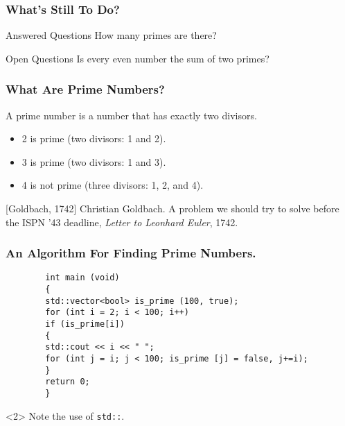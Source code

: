 \documentclass{beamer}
\begin{document}
\begin{frame}
    \frametitle{What’s Still To Do?}
    \begin{block}{Answered Questions}
    How many primes are there?
    \end{block}
    \begin{block}{Open Questions}
    Is every even number the sum of two primes?
    \end{block}
\end{frame}

\begin{frame}[t]
    \frametitle{What Are Prime Numbers?}
    \begin{definition}
    A \alert{prime number} is a number that has exactly two divisors.
    \end{definition}
    \begin{example}
    \begin{itemize}
    \item 2 is prime (two divisors: 1 and 2).
    \item 3 is prime (two divisors: 1 and 3).
    \item 4 is not prime (\alert{three} divisors: 1, 2, and 4).
    \end{itemize}
    \end{example}
\end{frame}

\begin{thebibliography}{10}
    [Goldbach, 1742]
    Christian Goldbach.
    \newblock A problem we should try to solve before the ISPN ’43 deadline,
    \newblock \emph{Letter to Leonhard Euler}, 1742.
\end{thebibliography}

    \begin{frame}[fragile]
        \frametitle{An Algorithm For Finding Prime Numbers.}
        \begin{verbatim}
        int main (void)
        {
        std::vector<bool> is_prime (100, true);
        for (int i = 2; i < 100; i++)
        if (is_prime[i])
        {
        std::cout << i << " ";
        for (int j = i; j < 100; is_prime [j] = false, j+=i);
        }
        return 0;
        }
        \end{verbatim}
        \begin{uncoverenv}<2>
        Note the use of \verb|std::|.
        \end{uncoverenv}
        
    
\end{frame}
\end{document}
